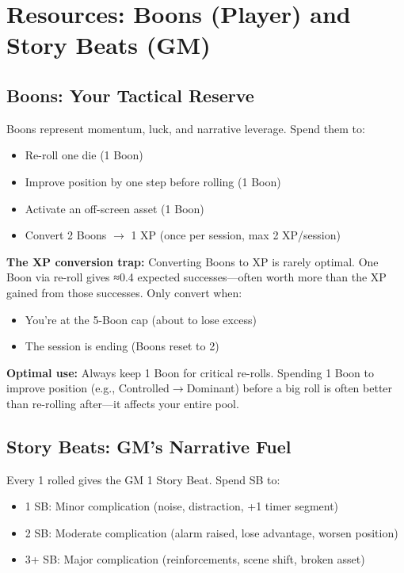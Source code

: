 \documentclass[11pt]{article}
\begin{document}
\section{Resources: Boons (Player) and Story Beats (GM)}

\subsection{Boons: Your Tactical Reserve}
Boons represent momentum, luck, and narrative leverage. Spend them to:
\begin{itemize}
    \item Re-roll one die (1 Boon)
    \item Improve position by one step before rolling (1 Boon)
    \item Activate an off-screen asset (1 Boon)
    \item Convert 2 Boons $\rightarrow$ 1 XP (once per session, max 2 XP/session)
\end{itemize}

\textbf{The XP conversion trap:} Converting Boons to XP is rarely optimal. One Boon via re-roll gives ≈0.4 expected successes---often worth more than the XP gained from those successes. Only convert when:
\begin{itemize}
    \item You're at the 5-Boon cap (about to lose excess)
    \item The session is ending (Boons reset to 2)
\end{itemize}

\textbf{Optimal use:} Always keep 1 Boon for critical re-rolls. Spending 1 Boon to improve position (e.g., Controlled$\rightarrow$Dominant) before a big roll is often better than re-rolling after---it affects your entire pool.

\subsection{Story Beats: GM's Narrative Fuel}
Every 1 rolled gives the GM 1 Story Beat. Spend SB to:
\begin{itemize}
    \item 1 SB: Minor complication (noise, distraction, +1 timer segment)
    \item 2 SB: Moderate complication (alarm raised, lose advantage, worsen position)
    \item 3+ SB: Major complication (reinforcements, scene shift, broken asset)
\end{itemize}
\end{document}
